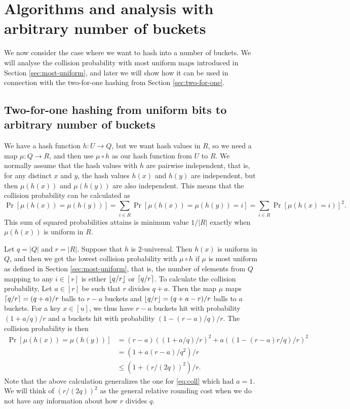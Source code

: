 
\section{Algorithms and analysis with arbitrary number of buckets}\label{sec:arbitrary-buckets}
We now consider the case where we want to hash into
a number of buckets. We will analyse the collision probability
with most uniform maps introduced in Section \ref{sec:most-uniform},
and later we will show how it can be used in connection with the
two-for-one hashing from Section \ref{sec:two-for-one}.

\subsection{Two-for-one hashing from uniform bits to arbitrary number of buckets}
We have a hash function $h:U\to Q$, but we want hash values in $R$, so
we need a map $\mu:Q\to R$, and then use $\mu\circ h$ as
our hash function from $U$ to $R$. We normally assume that the hash values 
with $h$ are pairwise independent, that is, for any distinct $x$ and $y$,
the hash values $h(x)$ and $h(y)$ are independent, but then 
$\mu(h(x))$ and $\mu(h(y))$ are also independent. This means
that the collision probability can be calculated
as 
\[\Pr[\mu(h(x))=\mu(h(y))]=\sum_{i\in R}\Pr[\mu(h(x))=\mu(h(y))=i]=\sum_{i\in R}\Pr[\mu(h(x)=i)]^2.\]
This sum of squared probabilities attains is minimum value $1/|R|$
exactly when $\mu(h(x))$ is uniform in $R$. 

Let $q=|Q|$ and $r=|R|$. Suppose that $h$ is $2$-universal. Then
$h(x)$ is uniform in $Q$, and then we get the lowest collision
probability with $\mu\circ h$ if $\mu$ is most uniform as defined in
Section \ref{sec:most-uniform}, that is, the number of elements from
$Q$ mapping to any $i\in[r]$ is either $\lfloor {q/r} \rfloor$ or
$\lceil {q/r}\rceil$. To calculate the collision probability,
Let $a\in[r]$ be such that $r$ divides $q+a$. Then the map $\mu$ maps
$\lceil {q/r}\rceil=(q+a)/r$ balls to $r-a$ buckets and
$\lfloor {q/r} \rfloor=(q+a-r)/r$ balls to $a$ buckets. For a key $x\in [u]$, we
thus have $r-a$ buckets hit with probability $(1+a/q)/r$ and
$a$ buckets hit with probability $(1-(r-a)/q)/r$.
The collision probability is then
\begin{equation}\begin{split}
   \Pr[\mu(h(x))=\mu(h(y))]
                  &= (r-a)((1+a/q)/r)^2+a((1-(r-a)r/q)/r)^2
                 \\&=(1+a(r-a)/q^2)/r
                 \\&\le \left(1+(r/(2q))^2\right)/r.\label{eq:coll-a}
\end{split}\end{equation}
Note that the above calculation generalizes the one for \eqref{eq:coll} which
had $a=1$. We will think of $(r/(2q))^2$ as the general relative rounding
cost when we do not have any information about how $r$ divides $q$.

